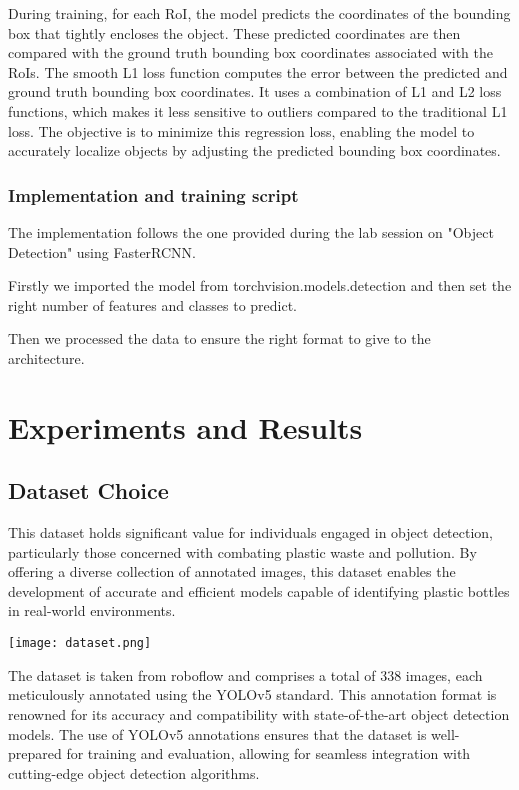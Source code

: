 During training, for each RoI, the model predicts the coordinates of the bounding box that tightly encloses the object. These predicted coordinates are then compared with the ground truth bounding box coordinates associated with the RoIs. The smooth L1 loss function computes the error between the predicted and ground truth bounding box coordinates. It uses a combination of L1 and L2 loss functions, which makes it less sensitive to outliers compared to the traditional L1 loss. The objective is to minimize this regression loss, enabling the model to accurately localize objects by adjusting the predicted bounding box coordinates.

\subsubsection{Implementation and training script}
The implementation follows the one provided during the lab session on "Object Detection" using FasterRCNN.

Firstly we imported the model from torchvision.models.detection and then set the right number of features and classes to predict.

Then we processed the data to ensure the right format to give to the architecture.

\section{Experiments and Results}

\subsection{Dataset Choice}

This dataset holds significant value for individuals engaged in object detection, particularly those concerned with combating plastic waste and pollution. By offering a diverse collection of annotated images, this dataset enables the development of accurate and efficient models capable of identifying plastic bottles in real-world environments.

\begin{center}
    \texttt{[image: dataset.png]}
\end{center}

The dataset is taken from roboflow and comprises a total of 338 images, each meticulously annotated using the YOLOv5 standard. This annotation format is renowned for its accuracy and compatibility with state-of-the-art object detection models. The use of YOLOv5 annotations ensures that the dataset is well-prepared for training and evaluation, allowing for seamless integration with cutting-edge object detection algorithms.

